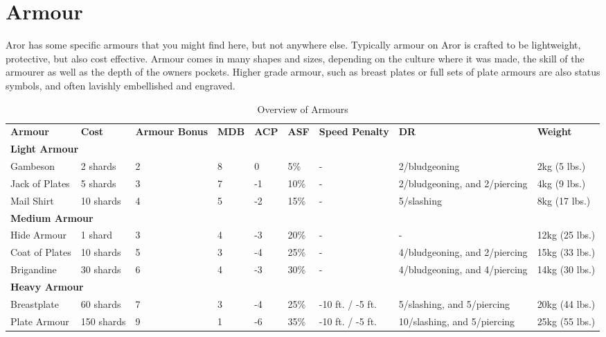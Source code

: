 \section{Armour}
\label{sec:Armour}

Aror has some specific armours that you might find here, but not anywhere
else.  Typically armour on Aror is crafted to be lightweight, protective, but
also cost effective. Armour comes in many shapes and sizes, depending on the
culture where it was made, the skill of the armourer as well as the depth of
the owners pockets. Higher grade armour, such as breast plates or full sets of
plate armours are also status symbols, and often lavishly embellished and
engraved.

\begin{table*}[!htb]
  \small
  \caption{Overview of Armours}
  \begin{tabular}{p{2cm} l p{1cm} l l l p{1cm} p{2.5cm} l}
    \textbf{Armour} & \textbf{Cost} & \textbf{Armour Bonus} & \textbf{MDB} & \textbf{ACP} & \textbf{ASF} & \textbf{Speed Penalty} & \textbf{DR} & \textbf{Weight} \\
    \multicolumn{9}{l}{\textbf{Light Armour}} \\
    Gambeson        &   2 shards  & 2 & 8 &  0 &  5\% & -                  & 2/bludgeoning                  &  2kg  (5 lbs.) \\
    Jack of Plates  &   5 shards  & 3 & 7 & -1 & 10\% & -                  & 2/bludgeoning, and 2/piercing  &  4kg  (9 lbs.) \\
    Mail Shirt      &  10 shards  & 4 & 5 & -2 & 15\% & -                  & 5/slashing                     &  8kg (17 lbs.) \\
    \multicolumn{9}{l}{\textbf{Medium Armour}} \\
    Hide Armour     &   1 shard   & 3 & 4 & -3 & 20\% & -                  & -                              & 12kg (25 lbs.) \\
    Coat of Plates  &  10 shards  & 5 & 3 & -4 & 25\% & -                  & 4/bludgeoning, and 2/piercing  & 15kg (33 lbs.) \\
    Brigandine      &  30 shards  & 6 & 4 & -3 & 30\% & -                  & 4/bludgeoning, and 4/piercing  & 14kg (30 lbs.) \\
    \multicolumn{9}{l}{\textbf{Heavy Armour}} \\
    Breastplate     &  60 shards  & 7 & 3 & -4 & 25\% & -10 ft. / -5 ft.   & 5/slashing, and 5/piercing     & 20kg (44 lbs.) \\
    Plate Armour    & 150 shards  & 9 & 1 & -6 & 35\% & -10 ft. / -5 ft.   & 10/slashing, and 5/piercing    & 25kg (55 lbs.) \\
  \end{tabular}
\end{table*}

